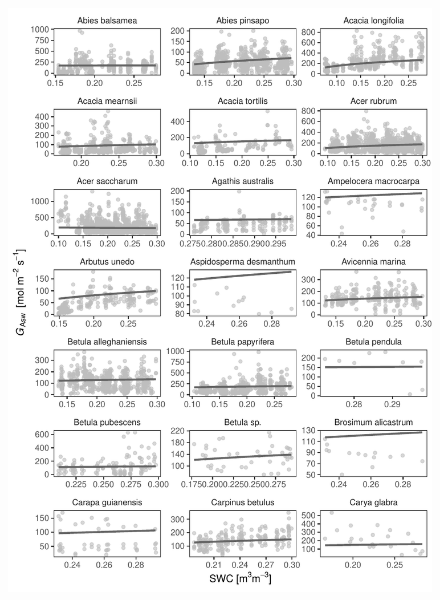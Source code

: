\documentclass[11pt,twoside]{reedthesis}
\begin{document}
\begin{figure}[H]

{\centering \includegraphics[width=1\linewidth]{figure/appendixD/ggg9} 

}

\end{figure}
\end{document}
